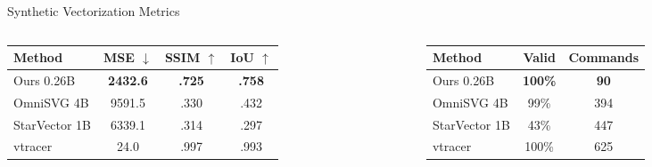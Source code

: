 \documentclass[
  aspectratio=169,
]{beamer}
\newcommand{\metricbest}[1]{\textbf{#1}}
\begin{document}
\begin{frame}{Synthetic Vectorization Metrics}
\small
\begin{columns}[T,onlytextwidth]
  \begin{column}{.52\textwidth}

    \vspace{.3em}
    \begin{tabular}{lccc}
      \toprule
      Method & MSE $\downarrow$ & SSIM $\uparrow$ & IoU $\uparrow$ \\
      \midrule
      Ours 0.26B & \metricbest{2432.6} & \metricbest{.725} & \metricbest{.758} \\
      OmniSVG 4B & 9591.5 & .330 & .432 \\
      StarVector 1B & 6339.1 & .314 & .297 \\
      \midrule
      vtracer & 24.0 & .997 & .993 \\
      \bottomrule
    \end{tabular}
  \end{column}
  \begin{column}{.43\textwidth}

    \vspace{.3em}
    \begin{tabular}{lcc}
      \toprule
      Method & Valid & Commands \\
      \midrule
      Ours 0.26B & \metricbest{100\%} & \metricbest{90} \\
      OmniSVG 4B & 99\% & 394 \\
      StarVector 1B & 43\% & 447 \\
      \midrule
      vtracer & 100\% & 625 \\
      \bottomrule
    \end{tabular}
  \end{column}
\end{columns}

\end{frame}
\end{document}
